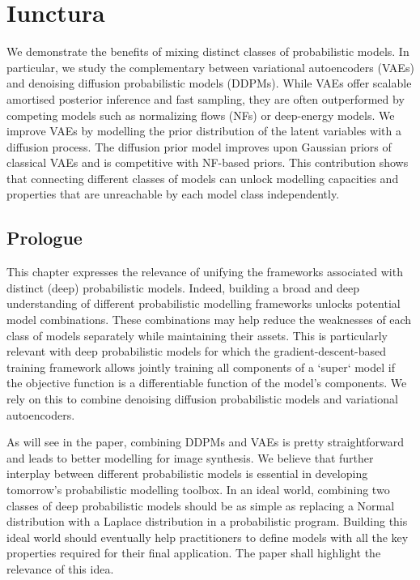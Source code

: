 \chapter{Iunctura}\label{ch:03}

\begin{chapter_outline}

  We demonstrate the benefits of mixing distinct classes of probabilistic models. In particular, we study the complementary between variational autoencoders (VAEs) and denoising diffusion probabilistic models (DDPMs). While VAEs offer scalable amortised posterior inference and fast sampling, they are often outperformed by competing models such as normalizing flows (NFs) or deep-energy models. We improve VAEs by modelling the prior distribution of the latent variables with a diffusion process. The diffusion prior model improves upon Gaussian priors of classical VAEs and is competitive with NF-based priors.
  This contribution shows that connecting different classes of models can unlock modelling capacities and properties that are unreachable by each model class independently.
\end{chapter_outline}
\section{Prologue}
This chapter expresses the relevance of unifying the frameworks associated with distinct (deep) probabilistic models. Indeed, building a broad and deep understanding of different probabilistic modelling frameworks unlocks potential model combinations. These combinations may help reduce the weaknesses of each class of models separately while maintaining their assets. This is particularly relevant with deep probabilistic models for which the gradient-descent-based training framework allows jointly training all components of a `super` model if the objective function is a differentiable function of the model's components. We rely on this to combine denoising diffusion probabilistic models and variational autoencoders.

As will see in the paper, combining DDPMs and VAEs is pretty straightforward and leads to better modelling for image synthesis. We believe that further interplay between different probabilistic models is essential in developing tomorrow's probabilistic modelling toolbox. In an ideal world, combining two classes of deep probabilistic models should be as simple as replacing a Normal distribution with a Laplace distribution in a probabilistic program. Building this ideal world should eventually help practitioners to define models with all the key properties required for their final application. The paper shall highlight the relevance of this idea.

